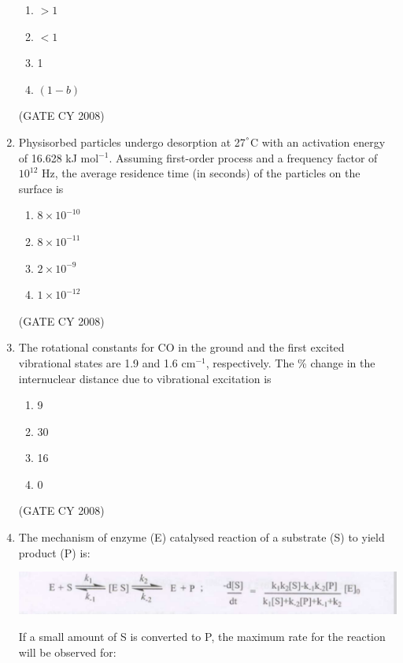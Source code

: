 \documentclass[12pt]{article}
\begin{document}
\begin{enumerate}
\begin{enumerate}
\item $> 1$
\item $< 1$
\item 1
\item $(1 - b)$
\end{enumerate}    \hfill{(GATE CY 2008)}




\item Physisorbed particles undergo desorption at 27$^\degree$C with an activation energy of 16.628 kJ mol$^{-1}$. Assuming first-order process and a frequency factor of $10^{12}$ Hz, the average residence time (in seconds) of the particles on the surface is

\begin{enumerate}
\item $8 \times 10^{-10}$
\item $8 \times 10^{-11}$
\item $2 \times 10^{-9}$
\item $1 \times 10^{-12}$
\end{enumerate}    \hfill{(GATE CY 2008)}




\item The rotational constants for CO in the ground and the first excited vibrational states are 1.9 and 1.6 cm$^{-1}$, respectively. The \% change in the internuclear distance due to vibrational excitation is

\begin{enumerate}
\item 9
\item 30
\item 16
\item 0
\end{enumerate}    \hfill{(GATE CY 2008)}




\item
The mechanism of enzyme (E) catalysed reaction of a substrate (S) to yield product (P) is:

\begin{center}
\includegraphics[width=0.6\columnwidth]{figs/q69.png}
\end{center}

If a small amount of S is converted to P, the maximum rate for the reaction will be observed for:


\end{enumerate}
\end{document}
